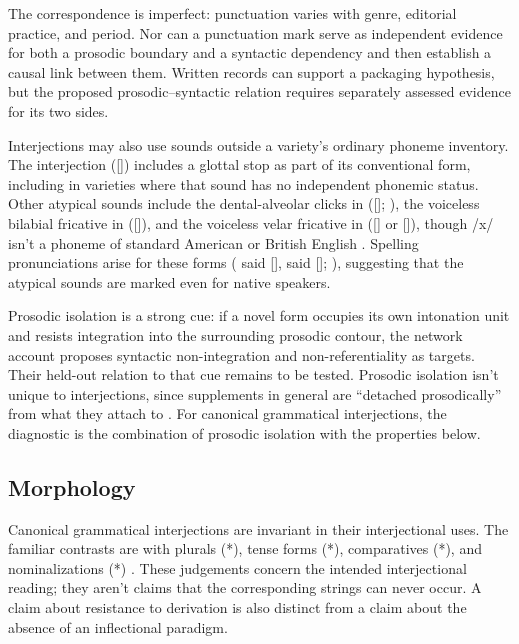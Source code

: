 \documentclass[12pt]{article}
\begin{document}
The correspondence is imperfect: punctuation varies with genre, editorial practice, and period. Nor can a punctuation mark serve as independent evidence for both a prosodic boundary and a syntactic dependency and then establish a causal link between them. Written records can support a packaging hypothesis, but the proposed prosodic--syntactic relation requires separately assessed evidence for its two sides.

Interjections may also use sounds outside a variety's ordinary phoneme inventory. The interjection  ([]) includes a glottal stop as part of its conventional form, including in varieties where that sound has no independent phonemic status. Other atypical sounds include the dental-alveolar clicks in  ([]; \citealp[147]{wilkins1992}), the voiceless bilabial fricative in  ([]), and the voiceless velar fricative in  ([] or []), though /x/ isn't a phoneme of standard American or British English \citep[74, 853]{quirk1985}. Spelling pronunciations arise for these forms ( said [],  said []; \citealp[853]{quirk1985}), suggesting that the atypical sounds are marked even for native speakers.

Prosodic isolation is a strong cue: if a novel form occupies its own intonation unit and resists integration into the surrounding prosodic contour, the network account proposes syntactic non-integration and non-referentiality as targets. Their held-out relation to that cue remains to be tested. Prosodic isolation isn't unique to interjections, since supplements in general are \enquote{detached prosodically} from what they attach to \citep[66]{HuddlestonPullum2002}. For canonical grammatical interjections, the diagnostic is the combination of prosodic isolation with the properties below.

\subsection{Morphology}

Canonical grammatical interjections are invariant in their interjectional uses. The familiar contrasts are with plurals (*), tense forms (*), comparatives (*), and nominalizations (*) \citep[106]{ameka1992}. These judgements concern the intended interjectional reading; they aren't claims that the corresponding strings can never occur. A claim about resistance to derivation is also distinct from a claim about the absence of an inflectional paradigm.
\end{document}
